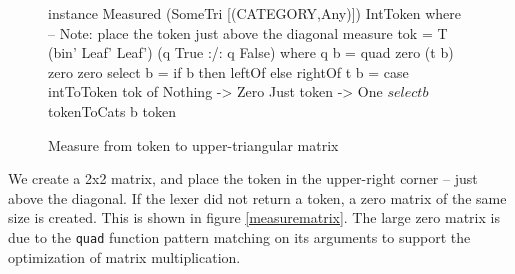 \documentclass[a4paper,12pt,twosided]{report}
\begin{document}
\begin{figure}[H]
\begin{code}
instance Measured (SomeTri [(CATEGORY,Any)]) IntToken where
    -- Note: place the token just above the diagonal
    measure tok = T (bin' Leaf' Leaf') (q True :/: q False)
      where q b = quad zero (t b) zero zero
            select b = if b then leftOf else rightOf
            t b = case intToToken tok of
                Nothing    -> Zero
                Just token -> One $ select b $ tokenToCats b token

\end{code}
\caption{\label{parsemeasure} Measure from token to upper-triangular matrix}
\end{figure}
We create a 2x2 matrix, and place the token in the upper-right corner -- just
above the diagonal. If the lexer did not return a token, a zero matrix of the
same size is created. This is shown in figure \ref{measurematrix}. The large
zero matrix is due to the \texttt{quad} function pattern matching on its
arguments to support the optimization of matrix multiplication.
\end{document}
